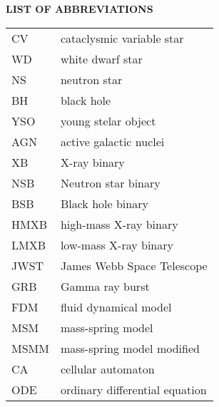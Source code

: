 \newpage
{}
{}
\noindent \Large \textbf{LIST OF ABBREVIATIONS}
\normalsize

\vspace{1cm}

\begin{center}
\def\arraystretch{1.5}%
\setlength\tabcolsep{1cm}
\begin{tabular}{ll}
    CV			& cataclysmic variable star \\
    WD			& white dwarf star \\
    NS          & neutron star \\
    BH          & black hole \\
    YSO         & young stelar object \\
    AGN         & active galactic nuclei \\
    XB          & X-ray binary \\
    NSB         & Neutron star binary \\
    BSB         & Black hole binary \\
    HMXB        & high-mass X-ray binary \\
    LMXB        & low-mass X-ray binary \\
    JWST        & James Webb Space Telescope \\
    GRB         & Gamma ray burst \\
    FDM			& fluid dynamical model \\
    MSM			& mass-spring model \\
    MSMM		& mass-spring model modified \\
    CA			& cellular automaton \\
    ODE			& ordinary differential equation
\end{tabular}
\end{center}
